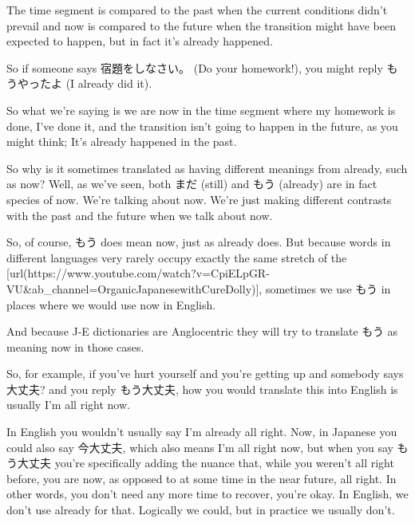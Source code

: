 The time segment is compared to the past when the current conditions didn't prevail and now is compared to the future when the transition might have been expected to happen, but in fact it's already happened.

{}

So if someone says 宿題をしなさい。 (Do your homework!), you might reply もうやったよ (I already did it).

So what we're saying is we are now in the time segment where my homework is done, I've done it, and the transition isn't going to happen in the future, as you might think; It's already happened in the past.

{}

So why is it sometimes translated as having different meanings from already, such as now? Well, as we've seen, both まだ (still) and もう (already) are in fact species of now. We're talking about now. We're just making different contrasts with the past and the future when we talk about now.

{}

So, of course, もう does mean now, just as already does. But because words in different languages very rarely occupy exactly the same stretch of the [url(https://www.youtube.com/watch?v=CpiELpGR-VU&ab_channel=OrganicJapanesewithCureDolly)], sometimes we use もう in places where we would use now in English.

{}

And because J-E dictionaries are Anglocentric they will try to translate もう as meaning now in those cases.

So, for example, if you've hurt yourself and you're getting up and somebody says 大丈夫? and you reply もう大丈夫,\crlf
how you would translate this into English is usually I'm all right now.

{}

In English you wouldn't usually say I'm already all right. Now, in Japanese you could also say 今大丈夫, which also means I'm all right now, but when you say もう大丈夫 you're specifically adding the nuance that, while you weren't all right before, you are now, as opposed to at some time in the near future, all right. In other words, you don't need any more time to recover, you're okay. In English, we don't use already for that. Logically we could, but in practice we usually don't.

